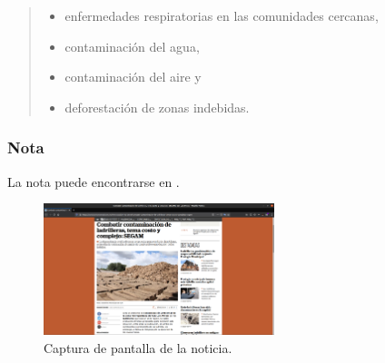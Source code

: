 \documentclass[12pt]{article}
\begin{document}
	\begin{quote}\begin{itemize}
		\item enfermedades respiratorias en las comunidades cercanas,
		\item contaminaci\'on del agua,
		\item contaminaci\'on del aire y
		\item deforestaci\'on de zonas indebidas.
	\end{itemize}\end{quote}





\subsubsection*{Nota}
	\par La nota puede encontrarse en \cite{noticia}.
	
	\begin{figure}[h]
		\centering
		\includegraphics [width=0.6\textwidth] {nota-ladrillos-SLP.png}
		\caption{Captura de pantalla de la noticia.}
	\end{figure}
\end{document}
